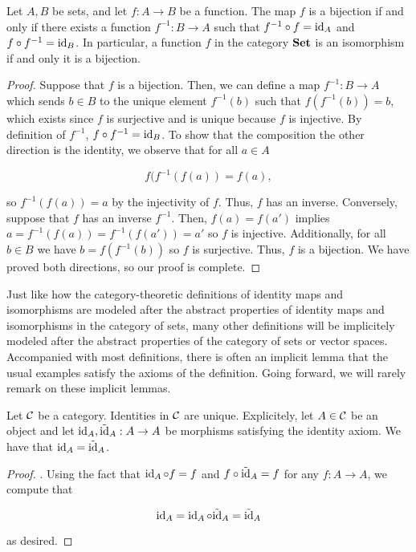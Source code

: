 \begin{lem} Let $A,B$ be sets, and let $f:A\to B$ be a function. The map $f$ is a bijection if and only if there exists a function $f^{-1}: B\to A$ such that $f^{-1}\circ f= \operatorname{id}_A$ and $f\circ f^{-1}=\operatorname{id}_B$. In particular, a function $f$ in the category ${\bf Set}$ is an isomorphism if and only it is a bijection.
\end{lem}
\begin{proof} Suppose that $f$ is a bijection. Then, we can define a map $f^{-1}:B\to A$ which sends $b\in B$ to the unique element $f^{-1}(b)$ such that $f(f^{-1}(b))=b$, which exists since $f$ is surjective and is unique because $f$ is injective. By definition of $f^{-1}$, $f\circ f^{-1}=\operatorname{id}_{B}$. To show that the composition the other direction is the identity, we observe that for all $a\in A$

$$f(f^{-1}(f(a))=f(a),$$

so $f^{-1}(f(a))=a$ by the injectivity of $f$. Thus, $f$ has an inverse. Conversely, suppose that $f$ has an inverse $f^{-1}$. Then, $f(a)=f(a')$ implies $a=f^{-1}(f(a))=f^{-1}(f(a'))=a'$ so $f$ is injective. Additionally, for all $b\in B$ we have $b=f(f^{-1}(b))$ so $f$ is surjective. Thus, $f$ is a bijection. We have proved both directions, so our proof is complete.
\end{proof}

\begin{rem} Just like how the category-theoretic definitions of identity maps and isomorphisms are modeled after the abstract properties of identity maps and isomorphisms in the category of sets, many other definitions will be implicitely modeled after the abstract properties of the category of sets or vector spaces. Accompanied with most definitions, there is often an implicit lemma that the usual examples satisfy the axioms of the definition. Going forward, we will rarely remark on these implicit lemmas.
\end{rem}

\begin{prop}\label{identity-unique} Let ${\mathcal C}$ be a category. Identities in ${\mathcal C}$ are unique. Explicitely, let $A\in {\mathcal C}$ be an object and let $\operatorname{id}_A,\tilde{\operatorname{id}}_A:A\to A$ be morphisms satisfying the identity axiom. We have that $\operatorname{id}_A=\tilde{\operatorname{id}}_A$.
\end{prop}
\begin{proof}. Using the fact that $\operatorname{id}_A \circ f = f$ and $f\circ \tilde{\operatorname{id}}_A=f$ for any $f:A\to A$, we compute that

$$\operatorname{id}_A= \operatorname{id}_A \circ \tilde{\operatorname{id}}_A = \tilde{\operatorname{id}}_A$$

as desired.
\end{proof}

